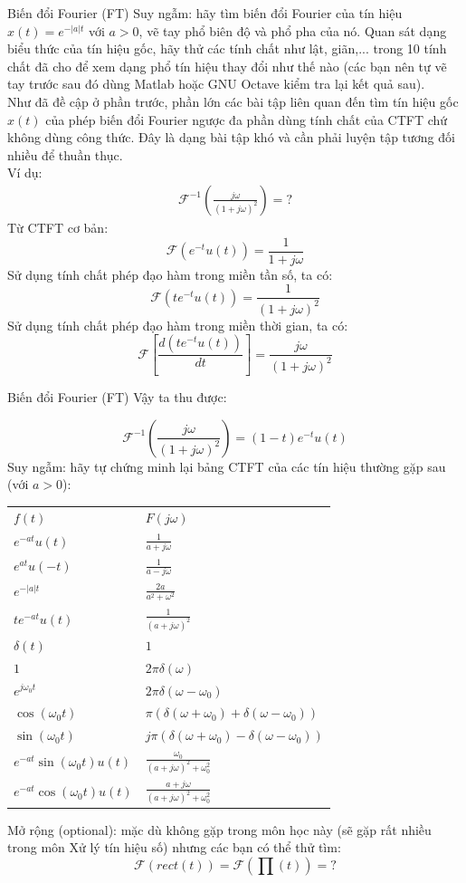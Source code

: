 \documentclass[8pt]{beamer}
\begin{document}
\begin{frame}{Biến đổi Fourier (FT)}
Suy ngẫm: hãy tìm biến đổi Fourier của tín hiệu $x(t)=e^{-|a|t}$ với $a>0$, vẽ tay phổ biên độ và phổ pha của nó. Quan sát dạng biểu thức của tín hiệu gốc, hãy thử các tính chất như lật, giãn,... trong 10 tính chất đã cho để xem dạng phổ tín hiệu thay đổi như thế nào (các bạn nên tự vẽ tay trước sau đó dùng Matlab hoặc GNU Octave kiểm tra lại kết quả sau).
\\ Như đã đề cập ở phần trước, phần lớn các bài tập liên quan đến tìm tín hiệu gốc $x(t)$ của phép biến đổi Fourier ngược đa phần dùng tính chất của CTFT chứ không dùng công thức. Đây là dạng bài tập khó và cần phải luyện tập tương đối nhiều để thuần thục.
\\ Ví dụ:
\begin{equation*}
\begin{split}
	\mathscr{F}^{-1}\left(\frac{j\omega}{(1+j\omega)^2}\right)=?
\end{split}
\end{equation*}
Từ CTFT cơ bản:
$$\mathscr{F}(e^{-t}u(t))=\frac{1}{1+j\omega}$$
Sử dụng tính chất phép đạo hàm trong miền tần số, ta có:
$$\mathscr{F}(te^{-t}u(t))=\frac{1}{(1+j\omega)^2}$$
Sử dụng tính chất phép đạo hàm trong miền thời gian, ta có:
$$\mathscr{F}\left[{\frac{d(te^{-t}u(t))}{dt}}\right]=\frac{j\omega}{(1+j\omega)^2}$$
\end{frame}
\begin{frame}{Biến đổi Fourier (FT)}
Vậy ta thu được:

$$	\mathscr{F}^{-1}\left(\frac{j\omega}{(1+j\omega)^2}\right)=(1-t)e^{-t}u(t)$$
Suy ngẫm: hãy tự chứng minh lại bảng CTFT của các tín hiệu thường gặp sau (với $a>0$):
\begin{center}
\begin{tabular}{ |l|l| } 
 \hline
 $f(t)$ & $F(j\omega)$ \\ 
 $e^{-at}u(t)$ & $\frac{1}{a+j\omega}$  \\ 
 $e^{at}u(-t)$ &   $\frac{1}{a-j\omega}$ \\ 
 $e^{-|a|t}$ & $\frac{2a}{a^2+\omega^2}$\\
 $te^{-at}u(t)$ & $\frac{1}{(a+j\omega)^2}$\\
 $\delta(t)$ & $1$\\
 $1$ & $2\pi\delta(\omega)$ \\
 $e^{j\omega_{0}t}$ & $2\pi\delta(\omega-\omega_{0})$\\
 $\cos(\omega_{0}t)$ & $\pi(\delta(\omega+\omega_{0})+\delta(\omega-\omega_{0}))$\\
 $\sin(\omega_{0}t)$ & $j\pi(\delta(\omega+\omega_{0})-\delta(\omega-\omega_{0}))$\\
 $e^{-at}\sin(\omega_{0}t)u(t)$ & $\frac{\omega_{0}}{(a+j\omega)^2+\omega_{0}^2}$\\
 $e^{-at}\cos(\omega_{0}t)u(t)$ & $\frac{a+j\omega}{(a+j\omega)^2+\omega_{0}^2}$\\

 \hline
\end{tabular}
\end{center}
Mở rộng (optional): mặc dù không gặp trong môn học này (sẽ gặp rất nhiều trong môn Xử lý tín hiệu số) nhưng các bạn có thể thử tìm:
$$\mathscr{F}(rect(t))=\mathscr{F}\left(\prod(t)\right)=?$$
\end{frame}
\end{document}
